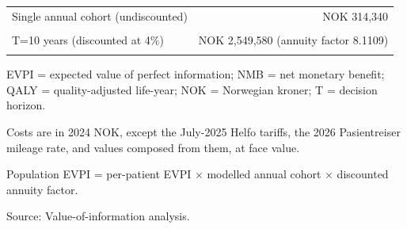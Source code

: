 \begin{table}[H]
{\begin{threeparttable}
\begin{tabular}[t]{>{\raggedright\arraybackslash}p{6.7cm}r}
\textcolor[HTML]{2D3748}{Single annual cohort (undiscounted)} & \textcolor[HTML]{2D3748}{NOK 314,340}\\
\cellcolor[HTML]{F7F9FC}{\textcolor[HTML]{2D3748}{T=5 years (discounted at 4\%)}} & \cellcolor[HTML]{F7F9FC}{\textcolor[HTML]{2D3748}{NOK 1,399,379 (annuity factor 4.4518)}}\\
\textcolor[HTML]{2D3748}{T=10 years (discounted at 4\%)} & \textcolor[HTML]{2D3748}{NOK 2,549,580 (annuity factor 8.1109)}\\
\cellcolor[HTML]{F7F9FC}{\textcolor[HTML]{2D3748}{T=20 years (discounted at 4\%)}} & \cellcolor[HTML]{F7F9FC}{\textcolor[HTML]{2D3748}{NOK 4,271,975 (annuity factor 13.5903)}}\\
\bottomrule
\end{tabular}
\begin{tablenotes}
\item EVPI = expected value of perfect information; NMB = net monetary benefit; QALY = quality-adjusted life-year; NOK = Norwegian kroner; T = decision horizon.
\item Costs are in 2024 NOK, except the July-2025 Helfo tariffs, the 2026 Pasientreiser mileage rate, and values composed from them, at face value.
\item Population EVPI = per-patient EVPI × modelled annual cohort × discounted annuity factor.
\item Source: Value-of-information analysis.
\end{tablenotes}
\end{threeparttable}
}
\end{table}
